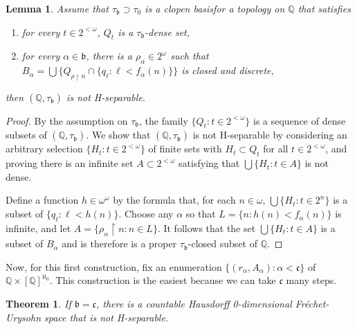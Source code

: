 \documentclass{amsart}
\newtheorem{theorem}[thm]{Theorem}
\newtheorem{lemma}[thm]{Lemma}
\theoremstyle{definition}
\theoremstyle{remark}
\begin{document}
\begin{lemma}  Assume that $\tau_{\mathfrak b}\supset \tau_0$
is a clopen basis\label{notH} for a topology on $\mathbb Q$ that satisfies
\begin{enumerate}
\item  for every $t\in 2^{<\omega}$, $Q_t$ is a $\tau_{\mathfrak b}$-dense
 set,
 \item for every $\alpha\in \mathfrak b$, there is a $\rho_\alpha\in 2^\omega$
 such that $B_\alpha = \bigcup\{
  Q_{\rho\restriction n}\cap \{q_\ell : \ell < f_\alpha(n) \}\}$ 
  is closed and discrete,
\end{enumerate}
then $(\mathbb Q, \tau_{\mathfrak b})$ is not H-separable.
\end{lemma}

\begin{proof}  By the assumption on $\tau_{\mathfrak b}$,
 the family $\{ Q_t : t\in 2^{<\omega}\}$ is a sequence 
 of dense subsets of $(\mathbb Q, \tau_{\mathfrak b})$. 
 We show that $(\mathbb Q, \tau_{\mathfrak b})$
 is not H-separable by considering an arbitrary
selection
 $\{ H_t : t\in 2^{<\omega}\}$  of finite
 sets with $H_t\subset Q_t$ for all $t\in 2^{<\omega}$,
 and proving there is an infinite set $A\subset 2^{<\omega}$
 satisfying that $\bigcup\{ H_t : t\in A\}$ is not dense. 
  
  Define a function $h\in \omega^\omega$ by the formula
 that, for each $n\in\omega$, 
   $\bigcup\{ H_t : t\in 2^n\}$ is a subset of
    $\{ q_\ell : \ell < h(n)\}$. 
    Choose any $\alpha$ so that 
      $L = \{ n : h(n) < f_\alpha(n)\}$ is infinite,
      and let $A  = \{ \rho_\alpha\restriction n : n\in L\}$.
   It follows that the set $  
    \bigcup \{ H_t : t\in A \}$
    is a subset of $B_\alpha$ and is therefore
    is a proper $\tau_{\mathfrak b}$-closed subset of $\mathbb Q$.
    \end{proof}

 Now, for this first construction,
  fix an enumeration $\{ (r_\alpha, A_\alpha) : \alpha < \mathfrak c\}$
 of $\mathbb Q\times [\mathbb Q]^{\aleph_0}$.   
    This   construction
  is the easiest because we can take $\mathfrak c$ many steps. 

\begin{theorem}
If   $\mathfrak b =  \mathfrak c$, 
 there is a countable Hausdorff 0-dimensional  Fr\'echet-Urysohn space that is
 not H-separable.
\end{theorem}
\end{document}
